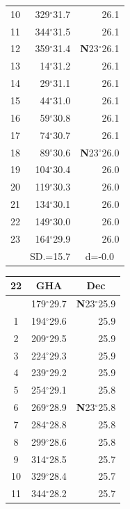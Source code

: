 \documentclass[10pt, a4paper]{report}
\begin{document}
\begin{scriptsize}
\begin{tabular*}{0.2\textwidth}[t]{@{\extracolsep{\fill}}|c|rr|}
10 & 329$^\circ$31.7 & 26.1\\
11 & 344$^\circ$31.5 & 26.1\\[2Pt]
12 & 359$^\circ$31.4 & \textbf{N}23$^\circ$26.1\\
13 & 14$^\circ$31.2 & 26.1\\
14 & 29$^\circ$31.1 & 26.1\\
15 & 44$^\circ$31.0 & \raisebox{0.24ex}{\boldmath$\cdot$~\boldmath$\cdot$~~}26.1\\
16 & 59$^\circ$30.8 & 26.1\\
17 & 74$^\circ$30.7 & 26.1\\[2Pt]
18 & 89$^\circ$30.6 & \textbf{N}23$^\circ$26.0\\
19 & 104$^\circ$30.4 & 26.0\\
20 & 119$^\circ$30.3 & 26.0\\
21 & 134$^\circ$30.1 & \raisebox{0.24ex}{\boldmath$\cdot$~\boldmath$\cdot$~~}26.0\\
22 & 149$^\circ$30.0 & 26.0\\
23 & 164$^\circ$29.9 & 26.0\\
\hline
\rule{0pt}{2.4ex} & \multicolumn{1}{c}{SD.=15.7} & \multicolumn{1}{c|}{d=-0.0}\\
\hline
\end{tabular*}\noindent
\begin{tabular*}{0.2\textwidth}[t]{@{\extracolsep{\fill}}|c|rr|}
\hline
\multicolumn{1}{|c|}{\rule{0pt}{2.6ex}\textbf{22}} & \multicolumn{1}{c}{\textbf{GHA}} & \multicolumn{1}{c|}{\textbf{Dec}}\\
\hline\rule{0pt}{2.6ex}\noindent
0 & 179$^\circ$29.7 & \textbf{N}23$^\circ$25.9\\
1 & 194$^\circ$29.6 & 25.9\\
2 & 209$^\circ$29.5 & 25.9\\
3 & 224$^\circ$29.3 & \raisebox{0.24ex}{\boldmath$\cdot$~\boldmath$\cdot$~~}25.9\\
4 & 239$^\circ$29.2 & 25.9\\
5 & 254$^\circ$29.1 & 25.8\\[2Pt]
6 & 269$^\circ$28.9 & \textbf{N}23$^\circ$25.8\\
7 & 284$^\circ$28.8 & 25.8\\
8 & 299$^\circ$28.6 & 25.8\\
9 & 314$^\circ$28.5 & \raisebox{0.24ex}{\boldmath$\cdot$~\boldmath$\cdot$~~}25.7\\
10 & 329$^\circ$28.4 & 25.7\\
11 & 344$^\circ$28.2 & 25.7\\[2Pt]

\end{tabular*}
\end{scriptsize}
\end{document}
